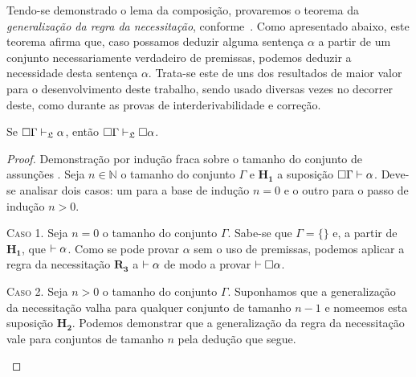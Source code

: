     \vspace{.5\baselineskip}
    Tendo-se demonstrado o lema da composição, provaremos o teorema da \emph{generalização da regra da necessitação}, conforme~\cite{Troelstra}.
    Como apresentado abaixo, este teorema afirma que, caso possamos deduzir alguma sentença $\alpha$ a partir de um conjunto necessariamente verdadeiro de premissas, podemos deduzir a necessidade desta sentença $\alpha$.
    Trata-se este de uns dos resultados de maior valor para o desenvolvimento deste trabalho, sendo usado diversas vezes no decorrer deste, como durante as provas de interderivabilidade e correção.

    \vspace{\baselineskip}
    \begin{tcolorbox}[enhanced jigsaw, breakable, sharp corners, colframe=black, colback=white, boxrule=0.5pt, left=1.5mm, right=1.5mm, top=1.5mm, bottom=1.5mm]
    \begin{theorem}\label{generalization}
        Se $\Box\Gamma\mathrel{\vdash}_{\mathfrak{L}}\alpha$, então $\Box\Gamma\mathrel{\vdash}_{\mathfrak{L}}\Box\alpha$.
        \begin{proof}
            Demonstração por indução fraca sobre o tamanho do conjunto de assunções \citep{Troelstra}.
            Seja $n\in\mathbb{N}$ o tamanho do conjunto $\Gamma$ e $\mathbf{H_1}$ a suposição $\Box\Gamma\mathrel{\vdash}\alpha$.
            Deve-se analisar dois casos: um para a base de indução $n=0$ e o outro para o passo de indução $n>0$.
            \begin{adjustwidth}{0pt}{}
            \vspace{.5\baselineskip}
            \textsc{Caso 1.}
            Seja $n=0$ o tamanho do conjunto $\Gamma$.
            Sabe-se que $\Gamma=\{\}$ e, a partir de $\mathbf{H_1}$, que ${\mathrel{\vdash}\alpha}$.
            Como se pode provar $\alpha$ sem o uso de premissas, podemos aplicar a regra da necessitação \hyperref[necessitation]{$\mathbf{R_3}$} a ${\mathrel{\vdash}\alpha}$ de modo a provar ${\mathrel{\vdash}\Box\alpha}$.
            \end{adjustwidth}
            \begin{case}
            \vspace{1\baselineskip}
            \textsc{Caso 2.} 
            Seja $n>0$ o tamanho do conjunto $\Gamma$.
            Suponhamos que a generalização da necessitação valha para qualquer conjunto de tamanho $n-1$ e nomeemos esta suposição $\mathbf{H_2}$.
            Podemos demonstrar que a generalização da regra da necessitação vale para conjuntos de tamanho $n$ pela dedução que segue.
            \end{case}


\end{proof}
\end{theorem}
\end{tcolorbox}
